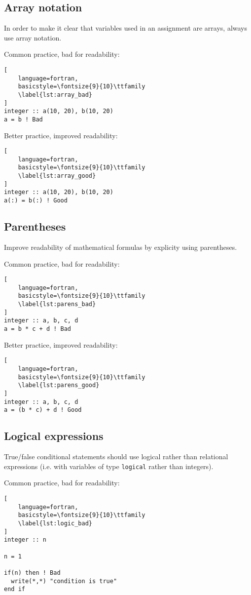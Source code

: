 \documentclass[11pt]{article}
\begin{document}
\subsection{Array notation}
In order to make it clear that variables used in an assignment are arrays, always use array notation.

Common practice, bad for readability:
\begin{lstlisting}[
	language=fortran,
    basicstyle=\fontsize{9}{10}\ttfamily
    \label{lst:array_bad}
]
integer :: a(10, 20), b(10, 20)
a = b ! Bad
\end{lstlisting}

Better practice, improved readability:
\begin{lstlisting}[
	language=fortran,
    basicstyle=\fontsize{9}{10}\ttfamily
    \label{lst:array_good}
]
integer :: a(10, 20), b(10, 20)
a(:) = b(:) ! Good
\end{lstlisting}

\subsection{Parentheses}
Improve readability of mathematical formulas by explicity using parentheses.

Common practice, bad for readability:
\begin{lstlisting}[
	language=fortran,
    basicstyle=\fontsize{9}{10}\ttfamily
    \label{lst:parens_bad}
]
integer :: a, b, c, d
a = b * c + d ! Bad
\end{lstlisting}

Better practice, improved readability:
\begin{lstlisting}[
	language=fortran,
    basicstyle=\fontsize{9}{10}\ttfamily
    \label{lst:parens_good}
]
integer :: a, b, c, d
a = (b * c) + d ! Good
\end{lstlisting}

\subsection{Logical expressions}
True/false conditional statements should use logical rather than relational expressions (i.e. with variables of 
type \texttt{logical} rather than integers). 

Common practice, bad for readability:
\begin{lstlisting}[
	language=fortran,
    basicstyle=\fontsize{9}{10}\ttfamily
    \label{lst:logic_bad}
]
integer :: n

n = 1

if(n) then ! Bad
  write(*,*) "condition is true"
end if
\end{lstlisting}
\end{document}

